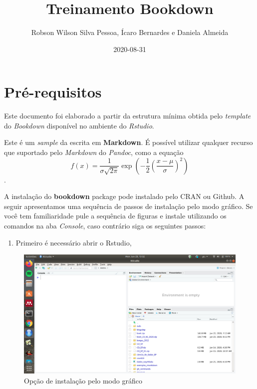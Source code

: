 \documentclass[
  oneside]{book}
\title{Treinamento Bookdown}
\author{Robson Wilson Silva Pessoa, Ícaro Bernardes e Daniela Almeida}
\date{2020-08-31}
\newenvironment{Shaded}{\begin{snugshade}}{\end{snugshade}}
\newcommand{\DataTypeTok}[1]{\textcolor[rgb]{0.13,0.29,0.53}{#1}}
\newcommand{\KeywordTok}[1]{\textcolor[rgb]{0.13,0.29,0.53}{\textbf{#1}}}
\newcommand{\NormalTok}[1]{#1}
\newcommand{\OperatorTok}[1]{\textcolor[rgb]{0.81,0.36,0.00}{\textbf{#1}}}
\newcommand{\OtherTok}[1]{\textcolor[rgb]{0.56,0.35,0.01}{#1}}
\providecommand{\tightlist}{%
  \setlength{\itemsep}{0pt}\setlength{\parskip}{0pt}}
\begin{document}
\maketitle

{
\setcounter{tocdepth}{1}
\tableofcontents
}
\begin{Shaded}
\end{Shaded}

\hypertarget{pruxe9-requisitos}{%
\chapter{Pré-requisitos}\label{pruxe9-requisitos}}

Este documento foi elaborado a partir da estrutura mínima
obtida pelo \emph{template} do \emph{Bookdown} disponível no ambiente
do \emph{Rstudio}.

Este é um \emph{sample} da escrita em \textbf{Markdown}. É
possível utilizar qualquer recurso que suportado
pelo \emph{Markdown} do \emph{Pandoc}, como a
equação
\[f(x) = \frac{1}{\sigma\sqrt{2\pi}}\exp\left(-\frac{1}{2}\left(\frac{x-\mu}{\sigma}\right)^2\right)\].

A instalação do \textbf{bookdown} package pode instalado pelo CRAN ou Github. A seguir apresentamos uma sequência
de passos de instalação pelo modo gráfico. Se
você tem familiaridade pule a sequência de
figuras e instale utilizando os comandos na aba
\emph{Console}, caso contrário siga os seguintes passos:

\begin{enumerate}
\def\labelenumi{\arabic{enumi}.}
\tightlist
\item
  Primeiro é necessário abrir o Rstudio,
\end{enumerate}

\begin{figure}
\centering
\includegraphics{fig/open_Rstudio.png}
\caption{Opção de instalação pelo modo gráfico}
\end{figure}
\end{document}
